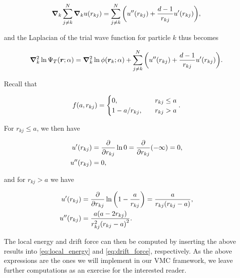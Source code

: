 \begin{equation*}
    \grad_k \sum_{j\neq k}^N \grad_k u \qty(r_{kj}) = \sum_{j\neq k}^N \qty(u'' \qty(r_{kj}) + \frac{d-1}{r_{kj}} u' \qty(r_{kj})),
\end{equation*}

and the Laplacian of the trial wave function for particle $k$ thus becomes 

\begin{equation}
    \grad_k^2 \ln \Psi_T \qty(\bm{r}; \alpha) = \grad_k^2 \ln \phi \qty(\bm{r}_k; \alpha) + \sum_{j\neq k}^N \qty(u'' \qty(r_{kj}) + \frac{d-1}{r_{kj}} u' \qty(r_{kj})).
\end{equation}

Recall that

\begin{equation*}
    f \qty(a, r_{kj}) = \begin{cases}
    0, \quad &r_{kj} \leq a 
    \\
    1 - a / r_{kj}, \quad &r_{kj} > a
    \end{cases}.
\end{equation*} 

For $r_{kj} \leq a $, we then have 

\begin{align}
    u' \qty(r_{kj}) &= \pdv{r_{kj}} \ln 0 = \pdv{r_{kj}} (-\infty) = 0, 
    \\
    u'' \qty(r_{kj}) &= 0, 
\end{align}

and for $r_{kj} > a$ we have 

\begin{align}
    u' \qty(r_{kj}) &= \pdv{r_{kj}} \ln \qty(1 - \frac{a}{r_{kj}}) = \frac{a}{r_{kj} \qty(r_{kj} - a)}, 
    \\
    u'' \qty(r_{kj}) &= \frac{a \qty(a - 2 r_{kj})}{r_{kj}^2 \qty(r_{kj}-a)^2}.
\end{align}

The local energy and drift force can then be computed by inserting the above results into \autoref{eq:local_energy} and \autoref{eq:drift_force}, respectively. As the above expressions are the ones we will implement in our VMC framework, we leave further computations as an exercise for the interested reader. 



